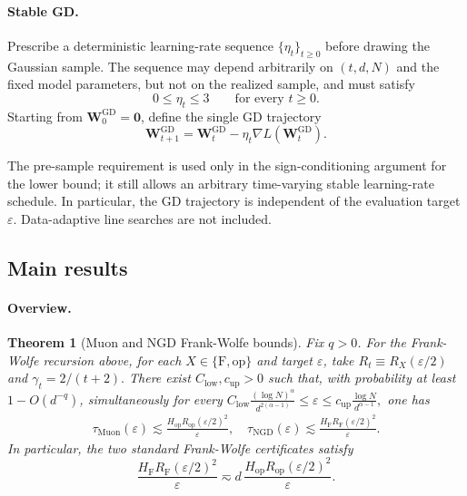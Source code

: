\documentclass[11pt]{article}
\newtheorem{theorem}{Theorem}[section]
\theoremstyle{definition}
\newcommand{\eps}{\varepsilon}
\newcommand{\HF}{H_{\mathrm F}}
\newcommand{\Hop}{H_{\mathrm{op}}}
\begin{document}
\paragraph{Stable GD.}
Prescribe a deterministic learning-rate sequence
$\{\eta_t\}_{t\geq 0}$ before drawing the Gaussian sample.  The sequence may
depend arbitrarily on $(t,d,N)$ and the fixed model parameters, but not on
the realized sample, and must satisfy
\begin{equation*}
    0\leq \eta_t\leq 3
    \qquad\text{for every }t\geq 0.
    \label{eq:eta-cap}
\end{equation*}
Starting from $\bm W^{\mathrm{GD}}_0=\bm 0$, define the single GD trajectory
\begin{equation*}
    \bm W^{\mathrm{GD}}_{t+1}
    =
    \bm W^{\mathrm{GD}}_t
    -\eta_t\nabla L(\bm W^{\mathrm{GD}}_t).
    \label{eq:gd-update}
\end{equation*}

The pre-sample requirement is used only in the sign-conditioning argument
for the lower bound; it still allows an arbitrary time-varying stable
learning-rate schedule.  In particular, the GD trajectory is independent of
the evaluation target $\varepsilon$.  Data-adaptive line searches are not
included.

\subsection*{Main results}

\paragraph{Overview.}


\begin{theorem}[Muon and NGD Frank-Wolfe bounds]
\label{thm:fw}
Fix $q>0$. For the Frank-Wolfe recursion above, for each $X\in\{\mathrm F,\mathrm{op}\}$ and target $\eps$, take
$R_t\equiv R_X(\eps/2)$ and $\gamma_t=2/(t+2).$ There exist $C_{\mathrm{low}},c_{\mathrm{up}}>0$ such that,
with probability at least $1-O(d^{-q})$, simultaneously for every
$
 C_{\mathrm{low}}
 \frac{(\log N)^\alpha}{d^{2(\alpha-1)}}
 \leq\eps\leq
 c_{\mathrm{up}}
 \frac{\log N}{d^{\alpha-1}},
$
one has
\begin{align*}
 \tau_{\mathrm{Muon}}(\eps)\lesssim
 \frac{\Hop R_{\mathrm{op}}(\eps/2)^2}{\eps}, \quad
 \tau_{\mathrm{NGD}}(\eps)
 \lesssim
 \frac{\HF R_{\mathrm F}(\eps/2)^2}{\eps}.
\end{align*}
In particular, the two standard Frank-Wolfe certificates satisfy
\[
 \frac{\HF R_{\mathrm F}(\eps/2)^2}{\eps}
 \eqsim
 d\,\frac{\Hop R_{\mathrm{op}}(\eps/2)^2}{\eps}.
\]
\end{theorem}
\end{document}
